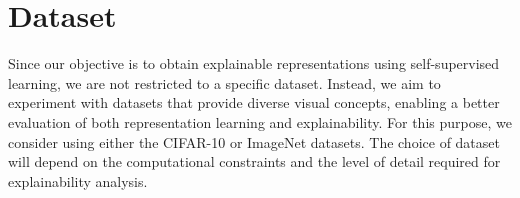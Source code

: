 \section{Dataset}
\label{sec:dataset}

Since our objective is to obtain explainable representations using self-supervised learning, we are not restricted to a specific dataset. Instead, we aim to experiment with datasets that provide diverse visual concepts, enabling a better evaluation of both representation learning and explainability. For this purpose, we consider using either the CIFAR-10 or ImageNet datasets. The choice of dataset will depend on the computational constraints and the level of detail required for explainability analysis.